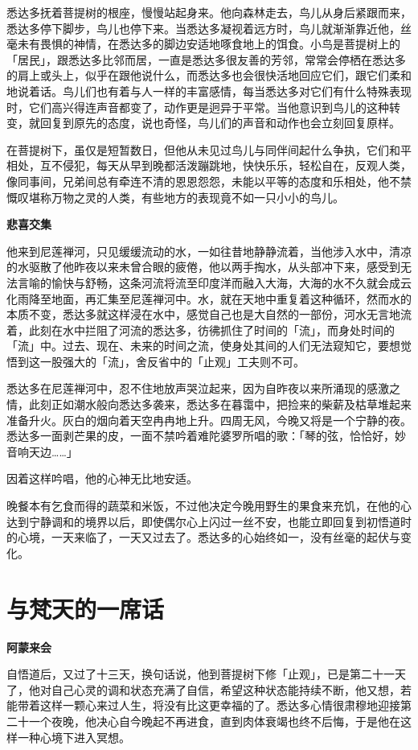\documentclass[twoside,openany]{book}
\newcommand{\mt}[1]{\textbullet \textbf{#1}}
\begin{document}
悉达多抚着菩提树的根座，慢慢站起身来。他向森林走去，鸟儿从身后紧跟而来，悉达多停下脚步，鸟儿也停下来。当悉达多凝视着远方时，鸟儿就渐渐靠近他，丝毫未有畏惧的神情，在悉达多的脚边安适地啄食地上的饵食。小鸟是菩提树上的「居民」，跟悉达多比邻而居，一直是悉达多很友善的芳邻，常常会停栖在悉达多的肩上或头上，似乎在跟他说什么，而悉达多也会很快活地回应它们，跟它们柔和地说着话。鸟儿们也有着与人一样的丰富感情，每当悉达多对它们有什么特殊表现时，它们高兴得连声音都变了，动作更是迥异于平常。当他意识到鸟儿的这种转变，就回复到原先的态度，说也奇怪，鸟儿们的声音和动作也会立刻回复原样。

在菩提树下，虽仅是短暂数日，但他从未见过鸟儿与同伴间起什么争执，它们和平相处，互不侵犯，每天从早到晚都活泼蹦跳地，快快乐乐，轻松自在，反观人类，像同事间，兄弟间总有牵连不清的恩恩怨怨，未能以平等的态度和乐相处，他不禁慨叹堪称万物之灵的人类，有些地方的表现竟不如一只小小的鸟儿。

\mt{悲喜交集}

他来到尼莲禅河，只见缓缓流动的水，一如往昔地静静流着，当他涉入水中，清凉的水驱散了他昨夜以来未曾合眼的疲倦，他以两手掏水，从头部冲下来，感受到无法言喻的愉快与舒畅，这条河流将流至印度洋而融入大海，大海的水不久就会成云化雨降至地面，再汇集至尼莲禅河中。水，就在天地中重复着这种循环，然而水的本质不变，悉达多就这样浸在水中，感觉自己也是大自然的一部份，河水无言地流着，此刻在水中拦阻了河流的悉达多，彷彿抓住了时间的「流」，而身处时间的「流」中。过去、现在、未来的时间之流，使身处其间的人们无法窥知它，要想觉悟到这一股强大的「流」，舍反省中的「止观」工夫则不可。

悉达多在尼莲禅河中，忍不住地放声哭泣起来，因为自昨夜以来所涌现的感激之情，此刻正如潮水般向悉达多袭来，悉达多在暮霭中，把捡来的柴薪及枯草堆起来准备升火。灰白的烟向着天空冉冉地上升。四周无风，今晚又将是一个宁静的夜。悉达多一面剥芒果的皮，一面不禁吟着难陀婆罗所唱的歌：「琴的弦，恰恰好，妙音响天边……」

因着这样吟唱，他的心神无比地安适。

晚餐本有乞食而得的蔬菜和米饭，不过他决定今晚用野生的果食来充饥，在他的心达到宁静调和的境界以后，即使偶尔心上闪过一丝不安，也能立即回复到初悟道时的心境，一天来临了，一天又过去了。悉达多的心始终如一，没有丝毫的起伏与变化。

\section{与梵天的一席话}\label{sec1.17}

\mt{阿蒙来会}

自悟道后，又过了十三天，换句话说，他到菩提树下修「止观」，已是第二十一天了，他对自己心灵的调和状态充满了自信，希望这种状态能持续不断，他又想，若能带着这样一颗心来过人生，将没有比这更幸福的了。悉达多心情很肃穆地迎接第二十一个夜晚，他决心自今晚起不再进食，直到肉体衰竭也终不后悔，于是他在这样一种心境下进入冥想。
\end{document}
